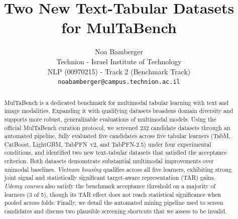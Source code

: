\documentclass{article}
\title{Two New Text-Tabular Datasets for MulTaBench}
\author{%
  Noa Bamberger\\
  Technion - Israel Institute of Technology \\
  NLP (00970215) - Track 2 (Benchmark Track) \\
  \texttt{noabamberger@campus.technion.ac.il} \\
}
\begin{document}
\maketitle



\begin{abstract}
MulTaBench is a dedicated benchmark for multimodal tabular learning with text and image modalities. Expanding it with qualifying datasets broadens domain diversity and supports more robust, generalizable evaluations of multimodal models. Using the official MulTaBench curation protocol, we screened 232 candidate datasets through an automated pipeline, fully evaluated five candidates across five tabular learners (TabM, CatBoost, LightGBM, TabPFN~v2, and TabPFN-2.5) under four experimental conditions, and identified two new text-tabular datasets that satisfied the acceptance criterion. Both datasets demonstrate substantial multimodal improvements over unimodal baselines. \emph{Vietnam housing} qualifies across all five learners, exhibiting strong joint signal and statistically significant target-aware representation (TAR) gains. \emph{Udemy courses} also satisfy the benchmark acceptance threshold on a majority of learners (3 of 5), though its TAR effect does not reach statistical significance when pooled across folds. Finally, we detail the automated mining pipeline used to screen candidates and discuss two plausible screening shortcuts that we assess to be invalid.
\end{abstract}
\end{document}
